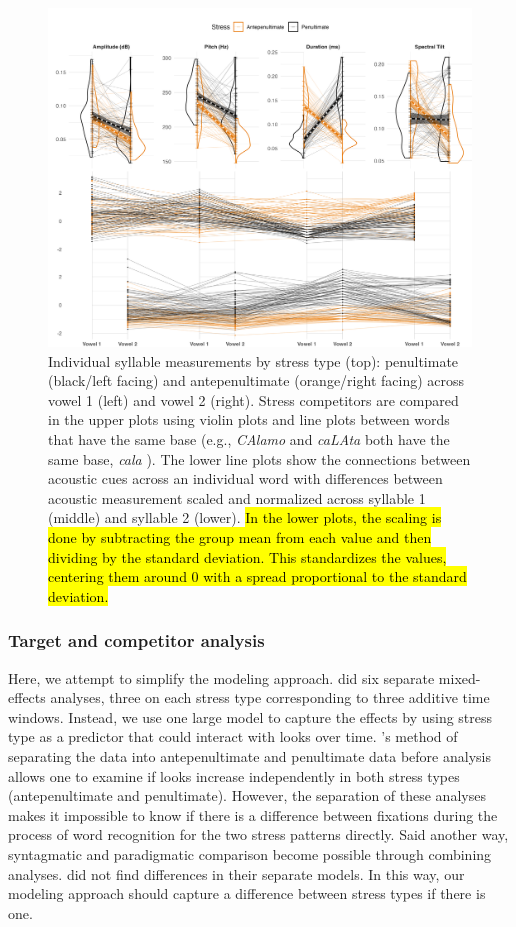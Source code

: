 \begin{figure}[H]
  \centering
  \includegraphics[width=1\linewidth]{visuals/raw_acoustics_combined.jpeg}
  \caption{Individual syllable measurements by stress type (top): penultimate (black/left facing) and antepenultimate (orange/right facing)  across vowel 1 (left) and vowel 2 (right). Stress competitors are compared in the upper plots using violin plots and line plots between words that have the same base (e.g., \textit{CAlamo} and \textit{caLAta} both have the same base, \textit{cala} ). The lower line plots show the connections between acoustic cues across an individual word with differences between acoustic measurement scaled and normalized across syllable 1 (middle) and syllable 2 (lower). \hl{In the lower plots, the scaling is done by subtracting the group mean from each value and then dividing by the standard deviation. This standardizes the values, centering them around 0 with a spread proportional to the standard deviation.}}
  \label{fig:raw_acoustics}
\end{figure}


\subsubsection{Target and competitor analysis}
Here, we attempt to simplify the modeling approach. \cite{Sulpizio_McQueen_2012} did six separate mixed-effects analyses, three on each stress type corresponding to three additive time windows. Instead, we use one large model to capture the effects by using stress type as a predictor that could interact with looks over time. \cite{Sulpizio_McQueen_2012}'s method of separating the data into antepenultimate and penultimate data before analysis allows one to examine if looks increase independently in both stress types (antepenultimate and penultimate). However, the separation of these analyses makes it impossible to know if there is a difference between fixations during the process of word recognition for the two stress patterns directly. Said another way, syntagmatic and paradigmatic comparison become possible through combining analyses. \cite{Sulpizio_McQueen_2012} did not find differences in their separate models. In this way, our modeling approach should capture a difference between stress types if there is one. 

